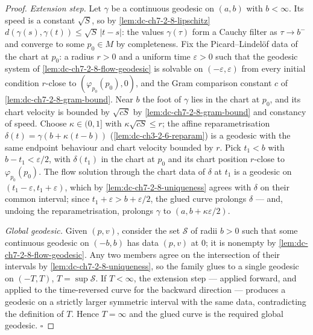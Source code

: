 \begin{proof}
  \leanok
  \emph{Extension step.} Let $\gamma$ be a continuous geodesic on $(a,b)$ with
  $b<\infty$. Its speed is a constant $\sqrt S$, so by
  \cref{lem:dc-ch7-2-8-lipschitz} $d(\gamma(s),\gamma(t))\le\sqrt S\,|t-s|$: the
  values $\gamma(\tau)$ form a Cauchy filter as $\tau\to b^-$ and converge to some
  $p_0\in M$ by completeness. Fix the Picard–Lindelöf data of the chart at $p_0$:
  a radius $r>0$ and a uniform time $\varepsilon>0$ such that the geodesic system
  of \cref{lem:dc-ch7-2-8-flow-geodesic} is solvable on $(-\varepsilon,\varepsilon)$
  from every initial condition $r$-close to $(\varphi_{p_0}(p_0),0)$, and the Gram
  comparison constant $c$ of \cref{lem:dc-ch7-2-8-gram-bound}. Near $b$ the foot
  of $\gamma$ lies in the chart at $p_0$, and its chart velocity is bounded by
  $\sqrt{cS}$ by \cref{lem:dc-ch7-2-8-gram-bound} and constancy of speed. Choose
  $\kappa\in(0,1]$ with $\kappa\sqrt{cS}\le r$; the affine reparametrisation
  $\delta(t)=\gamma(b+\kappa(t-b))$ (\cref{lem:dc-ch3-2-6-reparam}) is a geodesic
  with the same endpoint behaviour and chart velocity bounded by $r$. Pick
  $t_1<b$ with $b-t_1<\varepsilon/2$, with $\delta(t_1)$ in the chart at $p_0$ and
  its chart position $r$-close to $\varphi_{p_0}(p_0)$. The flow solution through
  the chart data of $\delta$ at $t_1$ is a geodesic on
  $(t_1-\varepsilon,t_1+\varepsilon)$, which by
  \cref{lem:dc-ch7-2-8-uniqueness} agrees with $\delta$ on their common interval;
  since $t_1+\varepsilon>b+\varepsilon/2$, the glued curve prolongs $\delta$ —
  and, undoing the reparametrisation, prolongs $\gamma$ to
  $(a,b+\kappa\varepsilon/2)$.

  \emph{Global geodesic.} Given $(p,v)$, consider the set $\mathcal S$ of radii
  $b>0$ such that some continuous geodesic on $(-b,b)$ has data $(p,v)$ at $0$;
  it is nonempty by \cref{lem:dc-ch7-2-8-flow-geodesic}. Any two members agree on
  the intersection of their intervals by \cref{lem:dc-ch7-2-8-uniqueness}, so the
  family glues to a single geodesic on $(-T,T)$, $T=\sup\mathcal S$. If
  $T<\infty$, the extension step — applied forward, and applied to the
  time-reversed curve for the backward direction — produces a geodesic on a
  strictly larger symmetric interval with the same data, contradicting the
  definition of $T$. Hence $T=\infty$ and the glued curve is the required global
  geodesic. $\square$
\end{proof}

